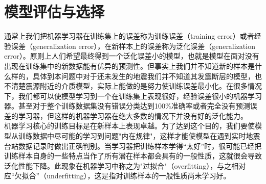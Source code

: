\section{模型评估与选择}
 \indent 通常上我们把机器学习器在训练集上的误差称为训练误差（training error）或者经验误差（generalization error），在新样本上的误差称为泛化误差（generalization error）。原则上人们希望最终得到一个泛化误差小的模型，也就是模型在面对没有出现在训练集中的新数据能有优异的预测性。但事实上我们并不知道新的样本是什么样的，具体到本问题中对于还未发生的地震我们并不知道其发震断层的模型，也不清楚震源附近的介质模型，实际上能做的是努力使训练误差最小化。在很多情况下，我们都可以使模型学习到一个在训练集上表现很好，经验误差很小的机器学习器。甚至对于整个训练数据集没有错误分类达到100\%准确率或者完全没有预测误差的学习器，但这样的机器学习器在绝大多数的情况下并没有好的泛化能力。\\
 \indent 机器学习核心的训练目标是在新样本上表现卓越。为了达到这个目的，我们要使模型从训练数据中尽可能的学习到问题"内在规律"，这样才能使模型在遇到实时地震台站数据记录时做出正确判别。当学习器把训练样本学得“太好”时，很可能已经把训练样本自身的一些特点当作了所有潜在样本都会具有的一般性质，这就很会导致泛化性能下降。此现象在机器学习中称之为"过拟合"（overfitting），与之相对应“欠拟合”（underfitting），这是指对训练样本的一般性质尚未学习好。\\
 
 



